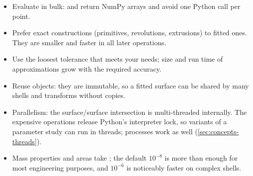 \begin{itemize}
  \item Evaluate in bulk:  and  return NumPy
    arrays and avoid one Python call per point.
  \item Prefer exact constructions (primitives, revolutions, extrusions) to fitted ones. They are
    smaller and faster in all later operations.
  \item Use the loosest tolerance that meets your needs; size and run time of approximations grow
    with the required accuracy.
  \item Reuse objects: they are immutable, so a fitted surface can be shared by many shells and
    transforms without copies.
  \item Parallelism: the surface/surface intersection is multi-threaded internally.
    The expensive operations release Python's interpreter lock, so variants of a parameter
    study can run in threads; processes work as well (\cref{sec:concepts-threads}).
  \item Mass properties and areas take ; the default $10^{-8}$ is more than enough
    for most engineering purposes, and $10^{-6}$ is noticeably faster on complex shells.
\end{itemize}
